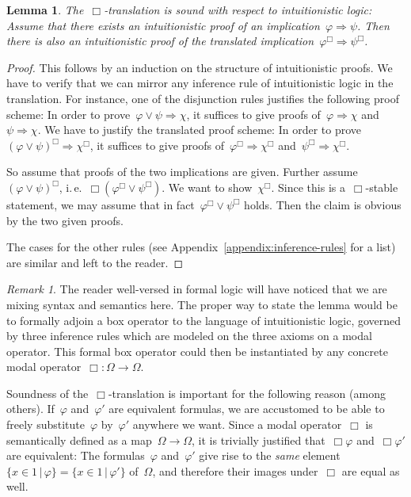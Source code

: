 \documentclass[10pt]{amsart}
\makeatletter
\theoremstyle{definition}
\theoremstyle{plain}
\newtheorem{lemma}[defn]{Lemma}
\theoremstyle{remark}
\newtheorem{rem}[defn]{Remark}
\newcommand{\?}{\,{:}\,}
\renewcommand{\_}{\mathpunct{.}\,}
\newcommand{\ie}{i.\,e.\@\xspace}
\makeatother
\begin{document}
\begin{lemma}\label{lemma:box-translation-sound}
The~$\Box$-translation is sound with respect to intuitionistic logic:
Assume that there exists an intuitionistic proof of an
implication~$\varphi \Rightarrow \psi$. Then there is also an intuitionistic
proof of the translated implication~$\varphi^\Box \Rightarrow \psi^\Box$.
\end{lemma}
\begin{proof}This follows by an induction on the structure of intuitionistic
proofs. We have to verify that we can mirror any inference rule of
intuitionistic logic in the translation. For instance, one of the disjunction
rules justifies the following proof scheme: In order to prove~$\varphi \vee
\psi \Rightarrow \chi$, it suffices to give proofs of~$\varphi \Rightarrow
\chi$ and~$\psi \Rightarrow \chi$. We have to justify the translated proof
scheme: In order to prove~$(\varphi \vee \psi)^\Box \Rightarrow \chi^\Box$, it
suffices to give proofs of~$\varphi^\Box \Rightarrow \chi^\Box$ and~$\psi^\Box
\Rightarrow \chi^\Box$.

So assume that proofs of the two implications are given. Further
assume~$(\varphi \vee \psi)^\Box$, \ie~$\Box(\varphi^\Box \vee \psi^\Box)$.
We want to show~$\chi^\Box$. Since this is a~$\Box$-stable statement, we may
assume that in fact~$\varphi^\Box \vee \psi^\Box$ holds. Then the claim is
obvious by the two given proofs.

The cases for the other rules (see Appendix~\ref{appendix:inference-rules} for
a list) are similar and left to the reader.\end{proof}

\begin{rem}The reader well-versed in formal logic will have noticed that we are
mixing syntax and semantics here. The proper way to state the lemma would be
to formally adjoin a box operator to the language of intuitionistic logic,
governed by three inference rules which are modeled on the three axioms on a
modal operator. This formal box operator could then be instantiated by any
concrete modal operator~$\Box : \Omega \to \Omega$.\end{rem}

Soundness of the~$\Box$-translation is important for the following reason
(among others). If~$\varphi$ and~$\varphi'$ are equivalent formulas, we are
accustomed to be able to freely substitute~$\varphi$ by~$\varphi'$ anywhere we
want. Since a modal operator~$\Box$ is semantically defined as a map~$\Omega
\to \Omega$, it is trivially justified that~$\Box\varphi$ and~$\Box\varphi'$
are equivalent: The formulas~$\varphi$ and~$\varphi'$ give rise to the
\emph{same} element~$\{x \in 1 \,|\, \varphi\} = \{x \in 1 \,|\, \varphi'\}$
of~$\Omega$, and therefore their images under~$\Box$ are equal as well.
\end{document}
